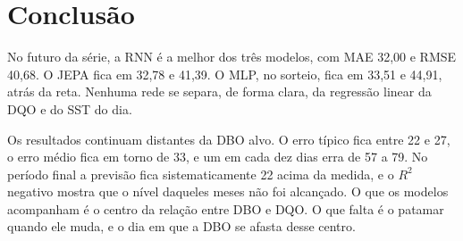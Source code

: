 \documentclass[11pt,a4paper]{article}
\begin{document}
\section{Conclusão}

No futuro da série, a RNN é a melhor dos três modelos, com MAE 32,00 e RMSE 40,68. O JEPA fica em 32,78 e 41,39. O MLP, no sorteio, fica em 33,51 e 44,91, atrás da reta. Nenhuma rede se separa, de forma clara, da regressão linear da DQO e do SST do dia.

Os resultados continuam distantes da DBO alvo. O erro típico fica entre 22 e 27, o erro médio fica em torno de 33, e um em cada dez dias erra de 57 a 79. No período final a previsão fica sistematicamente 22 acima da medida, e o \(R^{2}\) negativo mostra que o nível daqueles meses não foi alcançado. O que os modelos acompanham é o centro da relação entre DBO e DQO. O que falta é o patamar quando ele muda, e o dia em que a DBO se afasta desse centro.
\end{document}
